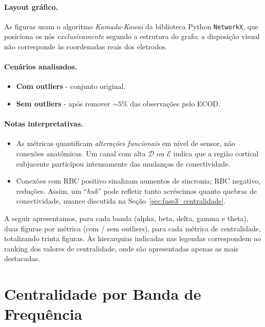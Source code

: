 \paragraph{Layout gráfico.}
As figuras usam o algoritmo \emph{Kamada-Kawai} da biblioteca Python \texttt{NetworkX}, que posiciona os nós \emph{exclusivamente} segundo a estrutura do grafo; a disposição visual não corresponde às coordenadas reais dos eletrodos.

\paragraph{Cenários analisados.}
\begin{itemize}
  \item \textbf{Com outliers} - conjunto original.
  \item \textbf{Sem outliers} - após remover \(\sim5\%\) das observações pelo ECOD.
\end{itemize}

\paragraph{Notas interpretativas.}
\begin{itemize}
  \item As métricas quantificam \emph{alterações funcionais} em nível de sensor, não conexões anatômicas.  
        Um canal com alta \(\mathcal{D}\) ou \(\mathcal{E}\) indica que a região cortical subjacente participou intensamente das mudanças de conectividade.
  \item Conexões com RBC positivo sinalizam aumentos de sincronia; RBC negativo, reduções.  
        Assim, um ``\textit{hub}'' pode refletir tanto acréscimos quanto quebras de conectividade, nuance discutida na Seção~\ref{sec:fase3_centralidade}.
\end{itemize}

\bigskip
A seguir apresentamos, para cada banda (alpha, beta, delta, gamma e theta), duas figuras por métrica (com / sem outliers), para cada métrica de centralidade, totalizando trinta figuras. As hierarquias indicadas nas legendas correspondem ao ranking dos valores de centralidade, onde são apresentadas apenas as mais destacadas.

\section{Centralidade por Banda de Frequência}

